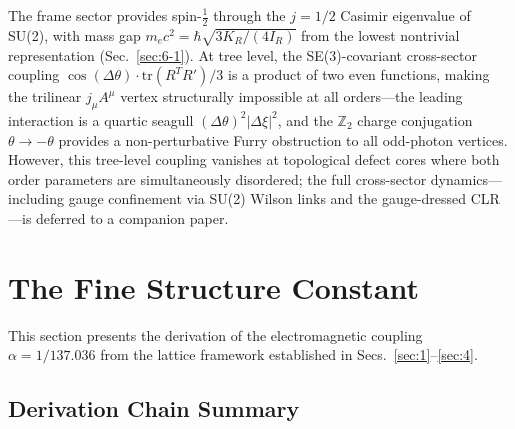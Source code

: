 \documentclass[aps,prd,onecolumn,superscriptaddress,floatfix,12pt]{revtex4-2}
\begin{document}
The frame sector provides spin-$\frac{1}{2}$ through the $j = 1/2$ Casimir eigenvalue of SU(2), with mass gap $m_e c^2 = \hbar\sqrt{3K_R/(4I_R)}$ from the lowest nontrivial representation (Sec.~\ref{sec:6-1}). At tree level, the SE(3)-covariant cross-sector coupling $\cos(\Delta\theta)\cdot\text{tr}(R^T R')/3$ is a product of two even functions, making the trilinear $j_\mu A^\mu$ vertex structurally impossible at all orders---the leading interaction is a quartic seagull $(\Delta\theta)^2|\Delta\xi|^2$, and the $\mathbb{Z}_2$ charge conjugation $\theta \to -\theta$ provides a non-perturbative Furry obstruction to all odd-photon vertices. However, this tree-level coupling vanishes at topological defect cores where both order parameters are simultaneously disordered; the full cross-sector dynamics---including gauge confinement via SU(2) Wilson links and the gauge-dressed CLR---is deferred to a companion paper.

\section{The Fine Structure Constant}\label{sec:5}

This section presents the derivation of the electromagnetic coupling $\alpha = 1/137.036$ from the lattice framework established in Secs.~\ref{sec:1}--\ref{sec:4}.

\subsection*{Derivation Chain Summary}
\end{document}
